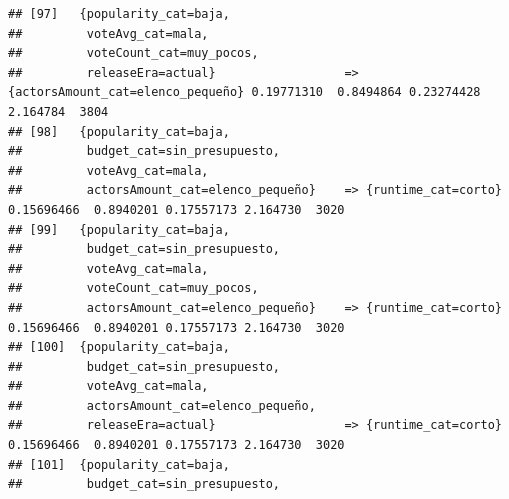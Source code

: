 \documentclass[
]{article}
\begin{document}
\begin{verbatim}
## [97]   {popularity_cat=baja,                                                                                                    
##         voteAvg_cat=mala,                                                                                                       
##         voteCount_cat=muy_pocos,                                                                                                
##         releaseEra=actual}                  => {actorsAmount_cat=elenco_pequeño} 0.19771310  0.8494864 0.23274428 2.164784  3804
## [98]   {popularity_cat=baja,                                                                                                    
##         budget_cat=sin_presupuesto,                                                                                             
##         voteAvg_cat=mala,                                                                                                       
##         actorsAmount_cat=elenco_pequeño}    => {runtime_cat=corto}               0.15696466  0.8940201 0.17557173 2.164730  3020
## [99]   {popularity_cat=baja,                                                                                                    
##         budget_cat=sin_presupuesto,                                                                                             
##         voteAvg_cat=mala,                                                                                                       
##         voteCount_cat=muy_pocos,                                                                                                
##         actorsAmount_cat=elenco_pequeño}    => {runtime_cat=corto}               0.15696466  0.8940201 0.17557173 2.164730  3020
## [100]  {popularity_cat=baja,                                                                                                    
##         budget_cat=sin_presupuesto,                                                                                             
##         voteAvg_cat=mala,                                                                                                       
##         actorsAmount_cat=elenco_pequeño,                                                                                        
##         releaseEra=actual}                  => {runtime_cat=corto}               0.15696466  0.8940201 0.17557173 2.164730  3020
## [101]  {popularity_cat=baja,                                                                                                    
##         budget_cat=sin_presupuesto,                                                                                             

\end{verbatim}
\end{document}
